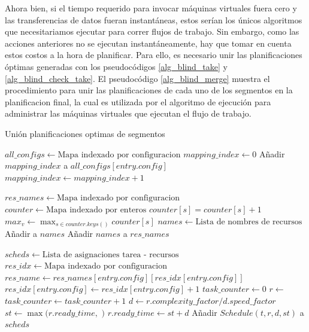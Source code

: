 Ahora bien, si el tiempo requerido para invocar máquinas virtuales fuera cero y las transferencias de datos fueran instantáneas, estos serían los únicos algoritmos que necesitariamos ejecutar para correr flujos de trabajo. Sin embargo, como las acciones anteriores no se ejecutan instantáneamente, hay que tomar en cuenta estos costos a la hora de planificar. Para ello, es necesario unir las planificaciones \'optimas generadas con los pseudoc\'odigos \ref{alg_blind_take} y \ref{alg_blind_check_take}. El pseudoc\'odigo \ref{alg_blind_merge} muestra el procedimiento para unir las planificaciones de cada uno de los segmentos en la planificacion final, la cual es utilizada por el algoritmo de ejecuci\'on para administrar las m\'aquinas virtuales que ejecutan el flujo de trabajo.


\begin{algorithm}
\caption{Uni\'on planificaciones optimas de segmentos}
\label{alg_blind_merge}
\begin{algorithmic}[1]
	\State $all\_configs \gets \text{Mapa indexado por configuracion}$
	\State $mapping\_index \gets 0$
        	\State Añadir $mapping\_index$ a $all\_configs[entry.config]$
        \EndFor
        \State $mapping\_index \gets mapping\_index + 1$
    \EndFor

    \State $res\_names \gets \text{Mapa indexado por configuracion}$
    	\State $counter \gets \text{Mapa indexado por enteros}$
			\State $counter[s] = counter[s] + 1$
    	\EndFor
    	\State ${max}_v \gets \max_{s \in counter.keys()} {counter[s]}$
    	\State $names \gets \text{Lista de nombres de recursos}$
    		\State Añadir  a $names$ 
    	\EndFor
    	\State Añadir $names$ a $res\_names$
    \EndFor

	\State $scheds \gets \text{Lista de asignaciones tarea - recursos}$
		\State $res\_idx \gets \text{Mapa indexado por configuracion}$
        	\State $res\_name \gets res\_names[ entry.config ] [ res\_idx[entry.config] ]$
        	\State $res\_idx[entry.config] \gets res\_idx[entry.config] + 1$
        	\State $task\_counter \gets 0$
        		\State $r \gets$ 
        		\State $task\_counter \gets task\_counter + 1$
        		\State $d \gets r.complexity\_factor / d.speed\_factor$
        		\State $st \gets \max(r.ready\_time,$ $)$
        		\State $r.ready\_time \gets st + d$
        		\State Añadir $Schedule(t, r, d, st)$ a $scheds$
        	\EndFor
        \EndFor
    \EndFor


\end{algorithmic}
\end{algorithm}
